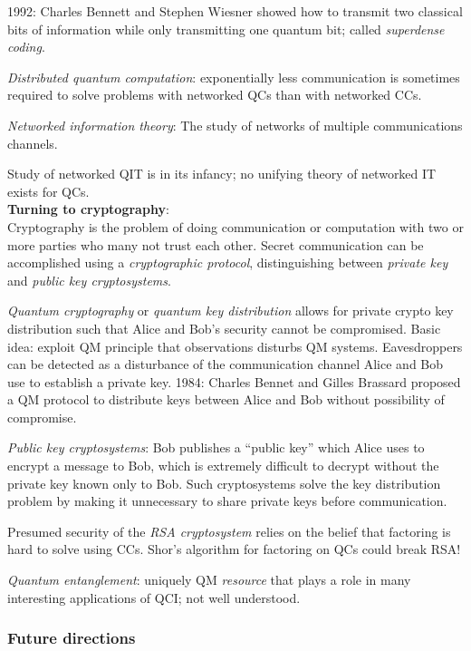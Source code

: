 \documentclass{article}
\numberwithin{equation}{section}
\begin{document}
1992: Charles Bennett and Stephen Wiesner showed how to transmit two classical bits of information while only transmitting one quantum bit; called \textit{superdense coding}.

\textit{Distributed quantum computation}: exponentially less communication is sometimes required to solve problems with networked QCs than with networked CCs.

\textit{Networked information theory}: The study of networks of multiple communications channels.

Study of networked QIT is in its infancy; no unifying theory of networked IT exists for QCs. \\

\textbf{Turning to cryptography}: \\

Cryptography is the problem of doing communication or computation with two or more parties who many not trust each other. Secret communication can be accomplished using a \textit{cryptographic protocol}, distinguishing between \textit{private key} and \textit{public key cryptosystems}.

\textit{Quantum cryptography} or \textit{quantum key distribution} allows for private crypto key distribution such that Alice and Bob's security cannot be compromised. Basic idea: exploit QM principle that observations disturbs QM systems. Eavesdroppers can be detected as a disturbance of the communication channel Alice and Bob use to establish a private key. 1984: Charles Bennet and Gilles Brassard proposed a QM protocol to distribute keys between Alice and Bob without possibility of compromise.

\textit{Public key cryptosystems}: Bob publishes a ``public key'' which Alice uses to encrypt a message to Bob, which is extremely difficult to decrypt without the private key known only to Bob. Such cryptosystems solve the key distribution problem by making it unnecessary to share private keys before communication.

Presumed security of the \textit{RSA cryptosystem} relies on the belief that factoring is hard to solve using CCs. Shor's algorithm for factoring on QCs could break RSA!

\textit{Quantum entanglement}: uniquely QM \textit{resource} that plays a role in many interesting applications of QCI; not well understood.

\subsubsection{Future directions}
\end{document}
